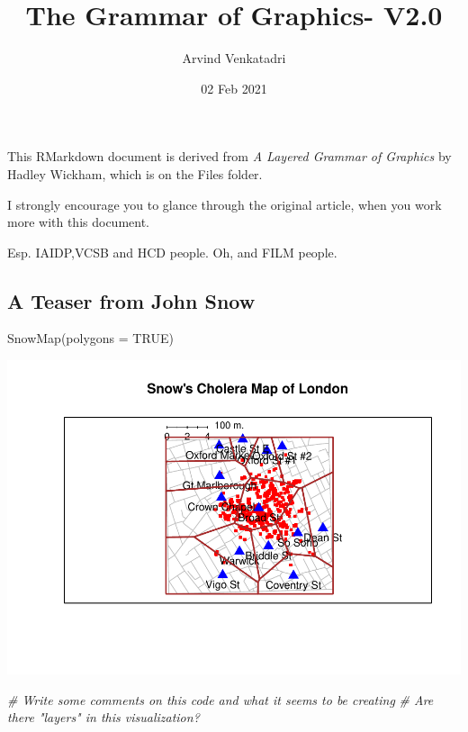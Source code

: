 \documentclass[
]{article}
\title{The Grammar of Graphics- V2.0}
\author{Arvind Venkatadri}
\date{02 Feb 2021}
\newenvironment{Shaded}{\begin{snugshade}}{\end{snugshade}}
\newcommand{\AttributeTok}[1]{\textcolor[rgb]{0.77,0.63,0.00}{#1}}
\newcommand{\CommentTok}[1]{\textcolor[rgb]{0.56,0.35,0.01}{\textit{#1}}}
\newcommand{\ConstantTok}[1]{\textcolor[rgb]{0.00,0.00,0.00}{#1}}
\newcommand{\FunctionTok}[1]{\textcolor[rgb]{0.00,0.00,0.00}{#1}}
\newcommand{\NormalTok}[1]{#1}
\begin{document}
\maketitle

{
\setcounter{tocdepth}{2}
\tableofcontents
}
This RMarkdown document is derived from \emph{A Layered Grammar of
Graphics} by Hadley Wickham, which is on the Files folder.

I strongly encourage you to glance through the original article, when
you work more with this document.

Esp. IAIDP,VCSB and HCD people. Oh, and FILM people.

\hypertarget{a-teaser-from-john-snow}{%
\subsection{A Teaser from John Snow}\label{a-teaser-from-john-snow}}

\begin{Shaded}
\begin{Highlighting}[]
\FunctionTok{SnowMap}\NormalTok{(}\AttributeTok{polygons =} \ConstantTok{TRUE}\NormalTok{)}
\end{Highlighting}
\end{Shaded}

\includegraphics{Grammar-of-Graphics_files/figure-latex/teaser-1.pdf}

\begin{Shaded}
\begin{Highlighting}[]
\CommentTok{\# Write some comments on this code and what it seems to be creating}
\CommentTok{\# Are there "layers" in this visualization?}
\end{Highlighting}
\end{Shaded}
\end{document}
